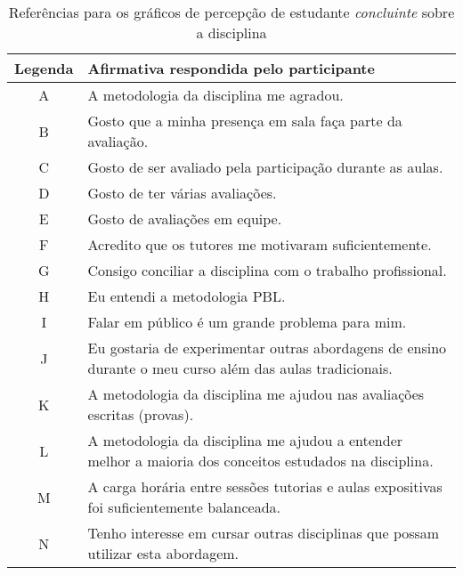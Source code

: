 \begin{table}[h]
\caption{Referências para os gráficos de percepção de estudante \textit{concluinte} sobre a disciplina}
\label{tabela-ref-graficos2}
\begin{tabular}{c|p{14.6cm}}
Legenda & Afirmativa respondida pelo participante \\
\hline
A & A metodologia da disciplina me agradou.\\
\hline
B & Gosto que a minha presença em sala faça parte da avaliação.\\
\hline
C & Gosto de ser avaliado pela participação durante as aulas.\\
\hline
D & Gosto de ter várias avaliações.\\
\hline
E & Gosto de avaliações em equipe.\\
\hline
F & Acredito que os tutores me motivaram suficientemente.\\
\hline
G & Consigo conciliar a disciplina com o trabalho profissional.\\
\hline
H & Eu entendi a metodologia PBL.\\
\hline
I & Falar em público é um grande problema para mim.\\
\hline
J & Eu gostaria de experimentar outras abordagens de ensino durante o meu curso além das aulas tradicionais.\\
\hline
K & A metodologia da disciplina me ajudou nas avaliações escritas (provas).\\
\hline
L & A metodologia da disciplina me ajudou a entender melhor a maioria dos conceitos estudados na disciplina.\\
\hline
M & A carga horária entre sessões tutorias e aulas expositivas foi suficientemente balanceada.\\
\hline
N & Tenho interesse em cursar outras disciplinas que possam utilizar esta abordagem.\\
\end{tabular}
\end{table}
